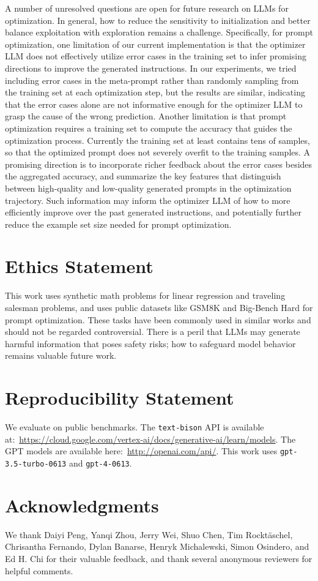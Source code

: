 A number of unresolved questions are open for future research on LLMs for optimization. 
In general, how to reduce the sensitivity to initialization and better balance exploitation with exploration remains a challenge. 
Specifically, for prompt optimization, one limitation of our current implementation is that the optimizer LLM does not effectively utilize error cases in the training set to infer promising directions to improve the generated instructions. 
In our experiments, we tried including error cases in the meta-prompt rather than randomly sampling from the training set at each optimization step, but the results are similar, indicating that the error cases alone are not informative enough for the optimizer LLM to grasp the cause of the wrong prediction.
Another limitation is that prompt optimization requires a training set to compute the accuracy that guides the optimization process. 
Currently the training set at least contains tens of samples, so that the optimized prompt does not severely overfit to the training samples. 
A promising direction is to incorporate richer feedback about the error cases besides the aggregated accuracy, and summarize the key features that distinguish between high-quality and low-quality generated prompts in the optimization trajectory.
Such information may inform the optimizer LLM of how to more efficiently improve over the past generated instructions, and potentially further reduce the example set size needed for prompt optimization.
\section*{Ethics Statement}
This work uses synthetic math problems for linear regression and traveling salesman problems, and uses public datasets like GSM8K and Big-Bench Hard for prompt optimization.
These tasks have been commonly used in similar works and should not be regarded controversial.
There is a peril that LLMs may generate harmful information that poses safety risks; how to safeguard model behavior remains valuable future work.

\section*{Reproducibility Statement}

We evaluate on public benchmarks. The \texttt{text-bison} API is available at:~\url{https://cloud.google.com/vertex-ai/docs/generative-ai/learn/models}. The GPT models are available here:~\url{http://openai.com/api/}. 
This work uses \texttt{gpt-3.5-turbo-0613} and \texttt{gpt-4-0613}.

\section*{Acknowledgments}

We thank Daiyi Peng, Yanqi Zhou, Jerry Wei, Shuo Chen, Tim Rocktäschel, Chrisantha Fernando, Dylan Banarse, Henryk Michalewski, Simon Osindero, and Ed H. Chi for their valuable feedback, and thank several anonymous reviewers for helpful comments.

\newpage

